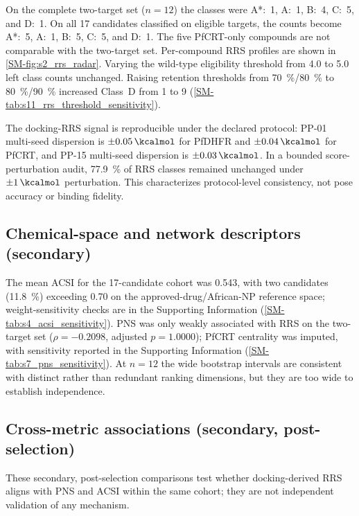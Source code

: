 \documentclass[journal=jcisd8,manuscript=article,layout=traditional]{achemso}
\begin{document}
On the complete two-target set ($n=\num{12}$) the classes were A*:~\num{1}, A:~\num{1}, B:~\num{4}, C:~\num{5}, and D:~\num{1}. On all 17 candidates classified on eligible targets, the counts become A*:~\num{5}, A:~\num{1}, B:~\num{5}, C:~\num{5}, and D:~\num{1}. The five PfCRT-only compounds are not comparable with the two-target set. Per-compound RRS profiles are shown in \cref{SM-fig:s2_rrs_radar}. Varying the wild-type eligibility threshold from \qty{4.0}{\kcalmol} to \qty{5.0}{\kcalmol} left class counts unchanged. Raising retention thresholds from \qty{70}{\percent}/\qty{80}{\percent} to \qty{80}{\percent}/\qty{90}{\percent} increased Class~D from 1 to 9 (\cref{SM-tab:s11_rrs_threshold_sensitivity}).

The docking-RRS signal is reproducible under the declared protocol: PP-01 multi-seed dispersion is $\pm\qty{0.05}{\kcalmol}$ for PfDHFR and $\pm\qty{0.04}{\kcalmol}$ for PfCRT, and PP-15 multi-seed dispersion is $\pm\qty{0.03}{\kcalmol}$. In a bounded score-perturbation audit, \qty{77.9}{\percent} of RRS classes remained unchanged under $\pm\qty{1}{\kcalmol}$ perturbation. This characterizes protocol-level consistency, not pose accuracy or binding fidelity.

\subsection{Chemical-space and network descriptors (secondary)}

The mean ACSI for the 17-candidate cohort was \num{0.543}, with two candidates (\qty{11.8}{\percent}) exceeding \num{0.70} on the approved-drug/African-NP reference space; weight-sensitivity checks are in the Supporting Information (\cref{SM-tab:s4_acsi_sensitivity}). PNS was only weakly associated with RRS on the two-target set ($\rho=\num{-0.2098}$, adjusted $p=\num{1.0000}$); PfCRT centrality was imputed, with sensitivity reported in the Supporting Information (\cref{SM-tab:s7_pns_sensitivity}). At $n=\num{12}$ the wide bootstrap intervals are consistent with distinct rather than redundant ranking dimensions, but they are too wide to establish independence.

\subsection{Cross-metric associations (secondary, post-selection)}

These secondary, post-selection comparisons test whether docking-derived RRS aligns with PNS and ACSI within the same cohort; they are not independent validation of any mechanism.
\end{document}
